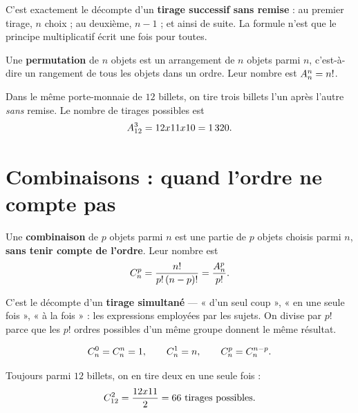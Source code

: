 \begin{remarque}
C'est exactement le décompte d'un \textbf{tirage successif sans remise} : au
premier tirage, $n$ choix ; au deuxième, $n-1$ ; et ainsi de suite. La
formule n'est que le principe multiplicatif écrit une fois pour toutes.
\end{remarque}

\begin{definition}[permutation]
Une \textbf{permutation} de $n$ objets est un arrangement de $n$ objets
parmi $n$, c'est-à-dire un rangement de tous les objets dans un ordre. Leur
nombre est $\arrang{n}{n} = n!$.
\end{definition}

\begin{exemple}
Dans le même porte-monnaie de $12$ billets, on tire trois billets l'un après
l'autre \emph{sans} remise. Le nombre de tirages possibles est
\[
  \arrang{3}{12} = 12\times11\times10 = 1\,320 .
\]
\end{exemple}

\section{Combinaisons : quand l'ordre ne compte pas}

\begin{definition}[combinaison]
Une \textbf{combinaison} de $p$ objets parmi $n$ est une partie de $p$
objets choisis parmi $n$, \textbf{sans tenir compte de l'ordre}. Leur nombre
est
\[
  \combi{p}{n} = \frac{n!}{p!\,(n-p)!} = \frac{\arrang{p}{n}}{p!} .
\]
\end{definition}

\begin{remarque}
C'est le décompte d'un \textbf{tirage simultané} — « d'un seul coup »,
« en une seule fois », « à la fois » : les expressions employées par les
sujets. On divise par $p!$ parce que les $p!$ ordres possibles d'un même
groupe donnent le même résultat.
\end{remarque}

\begin{propriete}
\[
  \combi{0}{n} = \combi{n}{n} = 1, \qquad
  \combi{1}{n} = n, \qquad
  \combi{p}{n} = \combi{n-p}{n} .
\]
\end{propriete}

\begin{exemple}
Toujours parmi $12$ billets, on en tire deux en une seule fois :
\[
  \combi{2}{12} = \frac{12\times11}{2} = 66 \text{ tirages possibles}.
\]
\end{exemple}


